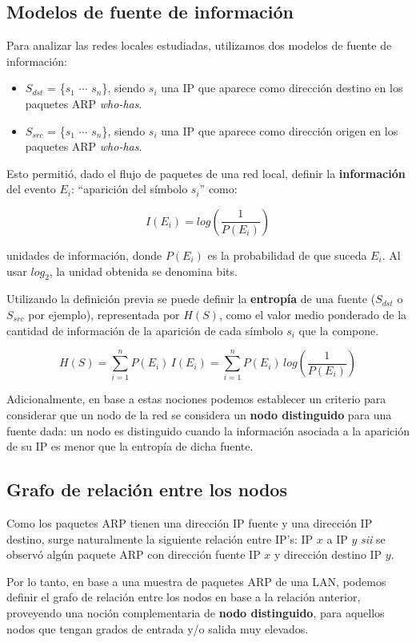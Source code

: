 \subsection{Modelos de fuente de información}

Para analizar las redes locales estudiadas, utilizamos dos modelos de fuente de información:
\vspace*{-2mm}

\begin{itemize}
  \item $S_{dst}$ = \{$s_1$ $\cdots$ $s_n$\}, siendo $s_i$ una IP que aparece como dirección destino en los paquetes ARP \emph{who-has}.
  \item $S_{src}$ = \{$s_1$ $\cdots$ $s_n$\}, siendo $s_i$ una IP que aparece como dirección origen en los paquetes ARP \emph{who-has}.
\end{itemize}

Esto permitió, dado el flujo de paquetes de una red local, definir la \textbf{información} del evento $E_i$: ``aparición del símbolo $s_i$'' como:

$$I (E_i) = log\left(\frac{1}{P(E_i)}\right)$$

unidades de información, donde $P(E_i)$ es la probabilidad de que suceda $E_i$. Al usar $log_2$, la unidad obtenida se denomina bits.

Utilizando la definición previa se puede definir la \textbf{entropía} de una fuente ($S_{dst}$ o $S_{src}$ por ejemplo), representada por $H(S)$, como el valor medio ponderado de la cantidad de información de la aparición de cada símbolo $s_i$ que la compone.

$$H(S) = \sum_{i=1}^{n} P(E_i)\,I(E_i) = \sum_{i=1}^{n} P(E_i)\,log\left(\frac{1}{P(E_i)}\right)$$

Adicionalmente, en base a estas nociones podemos establecer un criterio para considerar que un nodo de la red se considera un \textbf{nodo distinguido} para una fuente dada: un nodo es distinguido cuando la información asociada a la aparición de su IP es menor que la entropía de dicha fuente.

\subsection{Grafo de relación entre los nodos}
\label{subsec:grafo-relacion-nodos}

Como los paquetes ARP tienen una dirección IP fuente y una dirección IP destino, surge naturalmente la siguiente relación entre IP's: IP $x$ a IP $y$ \emph{sii} se observó algún paquete ARP con dirección fuente IP $x$ y dirección destino IP $y$.

Por lo tanto, en base a una muestra de paquetes ARP de una LAN, podemos definir el grafo de relación entre los nodos en base a la relación anterior, proveyendo una noción complementaria de \textbf{nodo distinguido}, para aquellos nodos que tengan grados de entrada y/o salida muy elevados.